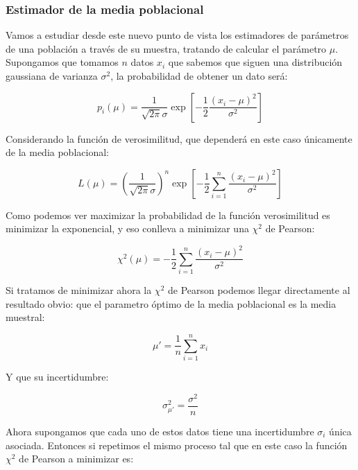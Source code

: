 \documentclass[12pt,a4paper]{book}
\newcommand{\parentesis}[1]{\left( #1 \right)}
\begin{document}
\subsubsection{Estimador de la media poblacional}

Vamos a estudiar desde este nuevo punto de vista los estimadores de parámetros de una población a través de su muestra, tratando de calcular el parámetro $\mu$. Supongamos que tomamos $n$ datos $x_i$ que sabemos que siguen una distribución gaussiana de varianza $\sigma^2$, la probabilidad de obtener un dato será:

\begin{equation}
p_i (\mu) = \dfrac{1}{\sqrt{2 \pi} \sigma} \exp \left[ -\dfrac{1}{2} \dfrac{(x_i - \mu)^2}{\sigma^2} \right]
\end{equation}

Considerando la función de verosimilitud, que dependerá en este caso únicamente de la media poblacional:

\begin{equation}
L (\mu) =\parentesis{\dfrac{1}{\sqrt{2 \pi} \sigma}}^n \exp \left[ -\dfrac{1}{2} \sum_{i=1}^n \dfrac{(x_i - \mu)^2}{\sigma^2} \right]
\end{equation}

Como podemos ver maximizar la probabilidad de la función verosimilitud es minimizar la exponencial, y eso conlleva a minimizar una $\chi^2$ de Pearson:

\begin{equation}
\chi^2(\mu)= -\dfrac{1}{2} \sum_{i=1}^n \dfrac{(x_i - \mu)^2}{\sigma^2}
\end{equation}

Si tratamos de minimizar ahora la  $\chi^2$ de Pearson podemos llegar directamente al resultado obvio: que el parametro óptimo de la media poblacional es la media muestral:

\begin{equation}
\mu' = \dfrac{1}{n} \sum_{i=1}^n x_i 
\end{equation}

Y que su incertidumbre:

\begin{equation}
\sigma_{\mu'}^2 = \dfrac{\sigma^2}{n}
\end{equation}

Ahora supongamos que cada uno de estos datos tiene una incertidumbre $\sigma_i$ única asociada. Entonces si repetimos el mismo proceso tal que en este caso la función  $\chi^2$ de Pearson a minimizar es:
\end{document}
